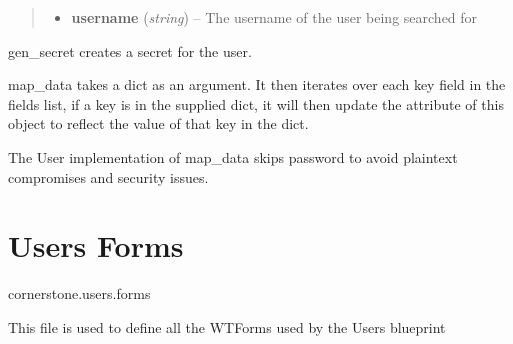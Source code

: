 \documentclass[letterpaper,10pt,english]{sphinxmanual}
\begin{document}
\begin{fulllineitems}
\begin{fulllineitems}
\begin{quote}
\begin{description}
\begin{itemize}
\item {} 
\textbf{username} (\emph{string}) -- The username of the user being searched for

\end{itemize}

\end{description}\end{quote}

\end{fulllineitems}


\begin{fulllineitems}
\label{dev-users:cagenix.users.models.User.gen_secret}
gen\_secret creates a secret for the user.

\end{fulllineitems}


\begin{fulllineitems}
\label{dev-users:cagenix.users.models.User.map_data}
map\_data takes a dict as an argument. It then iterates
over each key field in the fields list, if a key is
in the supplied dict, it will then update the attribute of
this object to reflect the value of that key in the dict.

The User implementation of map\_data skips password to avoid plaintext
compromises and security issues.

\end{fulllineitems}


\end{fulllineitems}



\section{Users Forms}
\label{dev-users:module-cagenix.users.forms}\label{dev-users:users-forms}\label{dev-users:users-forms-label}
cornerstone.users.forms

This file is used to define all the WTForms used by the Users blueprint
\end{document}
